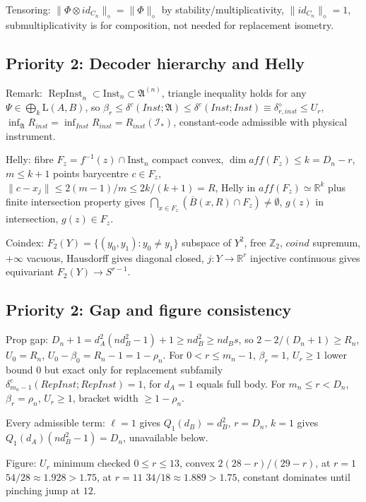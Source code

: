 \documentclass[11pt,a4paper]{article}
\newcommand{\Lin}{\mathrm{L}}
\newcommand{\Inst}{\mathrm{Inst}}
\begin{document}
Tensoring: $\|\Phi\otimes id_{C_n}\|_\diamond=\|\Phi\|_\diamond$ by stability/multiplicativity, $\|id_{C_n}\|_\diamond=1$, submultiplicativity is for composition, not needed for replacement isometry.

\subsection{Priority 2: Decoder hierarchy and Helly}

Remark: $\operatorname{RepInst}_n\subset\Inst_n\subset\mathfrak A^{(n)}$, triangle inequality holds for any $\Psi\in\bigoplus_k\Lin(A,B)$, so $\beta_r\le\delta^c(Inst;\mathfrak A)\le\delta^c(Inst;Inst)\equiv\delta^\diamond_{r,inst}\le U_r$, $\inf_{\mathfrak A}R_{inst}=\inf_{Inst}R_{inst}=R_{inst}(\mathcal I_*)$, constant-code admissible with physical instrument.

Helly: fibre $F_z=f^{-1}(z)\cap\Inst_n$ compact convex, $\dim aff(F_z)\le k=D_n-r$, $m\le k+1$ points barycentre $c\in F_z$, $\|c-x_j\|\le2(m-1)/m\le2k/(k+1)=R$, Helly in $aff(F_z)\simeq\mathbb R^k$ plus finite intersection property gives $\bigcap_{x\in F_z}(\overline B(x,R)\cap F_z)\ne\emptyset$, $g(z)$ in intersection, $g(z)\in F_z$.

Coindex: $F_2(Y)=\{(y_0,y_1):y_0\ne y_1\}$ subspace of $Y^2$, free $\mathbb Z_2$, $coind$ supremum, $+\infty$ vacuous, Hausdorff gives diagonal closed, $j:Y\to\mathbb R^r$ injective continuous gives equivariant $F_2(Y)\to S^{r-1}$.

\subsection{Priority 2: Gap and figure consistency}

Prop gap: $D_n+1=d_A^2(nd_B^2-1)+1\ge nd_B^2\ge nd_Bs$, so $2-2/(D_n+1)\ge R_n$, $U_0=R_n$, $U_0-\beta_0=R_n-1=1-\rho_n$. For $0<r\le m_n-1$, $\beta_r=1$, $U_r\ge1$ lower bound $0$ but exact only for replacement subfamily $\delta^{c}_{m_n-1}(RepInst;RepInst)=1$, for $d_A=1$ equals full body. For $m_n\le r<D_n$, $\beta_r=\rho_n$, $U_r\ge1$, bracket width $\ge1-\rho_n$.

Every admissible term: $\ell=1$ gives $Q_1(d_B)=d_B^2$, $r=D_n$, $k=1$ gives $Q_1(d_A)(nd_B^2-1)=D_n$, unavailable below.

Figure: $U_r$ minimum checked $0\le r\le13$, convex $2(28-r)/(29-r)$, at $r=1$ $54/28\approx1.928>1.75$, at $r=11$ $34/18\approx1.889>1.75$, constant dominates until pinching jump at $12$.
\end{document}

